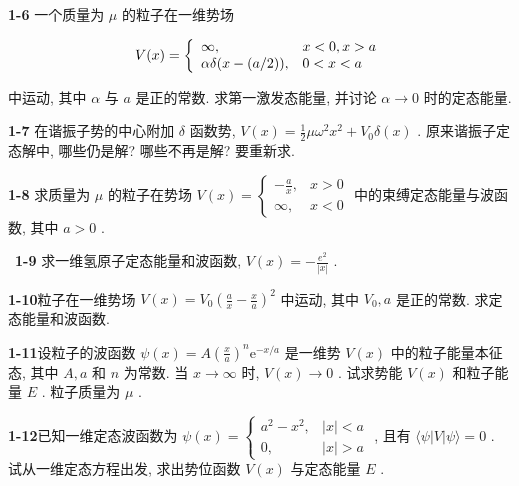 \textbf{1-6} 一个质量为 $\mu$ 的粒子在一维势场

$$
V (x) = \left\{ \begin{array}{l l} \infty , & x <   0, x > a \\ \alpha \delta (x - (a / 2)), & 0 <   x <   a \end{array} \right.
$$

中运动, 其中 $\alpha$ 与 $a$ 是正的常数. 求第一激发态能量, 并讨论 $\alpha \to 0$ 时的定态能量.

\vfill

\newpage
\vfill


\textbf{1-7} 在谐振子势的中心附加 $\delta$ 函数势, $V(x) = \frac{1}{2} \mu \omega^2 x^2 + V_0 \delta(x)$ . 原来谐振子定态解中, 哪些仍是解? 哪些不再是解? 要重新求.

\vfill

\newpage
\vfill


\textbf{1-8} 求质量为 $\mu$ 的粒子在势场 $V(x) = \begin{cases} -\frac{a}{x}, & x > 0 \\ \infty, & x < 0 \end{cases}$ 中的束缚定态能量与波函数, 其中 $a > 0$ .

\vfill

\newpage
\vfill

\
\textbf{1-9} 求一维氢原子定态能量和波函数, $V(x) = -\frac{e^2}{|x|}$ .

\vfill

\newpage
\vfill

\noindent
\textbf{1-10}\quad 粒子在一维势场 $V(x) = V_{0}\left(\frac{a}{x} -\frac{x}{a}\right)^{2}$ 中运动, 其中 $V_{0}, a$ 是正的常数. 求定态能量和波函数.

\vfill

\newpage
\vfill

\noindent
\textbf{1-11}\quad 设粒子的波函数 $\psi(x) = A\left(\frac{x}{a}\right)^n\mathrm{e}^{-x / a}$ 是一维势 $V(x)$ 中的粒子能量本征态, 其中 $A, a$ 和 $n$ 为常数. 当 $x \to \infty$ 时, $V(x) \to 0$ . 试求势能 $V(x)$ 和粒子能量 $E$ . 粒子质量为 $\mu$ .

\vfill

\newpage
\vfill

\noindent
\textbf{1-12}\quad 已知一维定态波函数为 $\psi(x) = \begin{cases} a^2 - x^2, & |x| < a \\ 0, & |x| > a \end{cases}$ , 且有 $\langle \psi | V | \psi \rangle = 0$ . 试从一维定态方程出发, 求出势位函数 $V(x)$ 与定态能量 $E$ .

